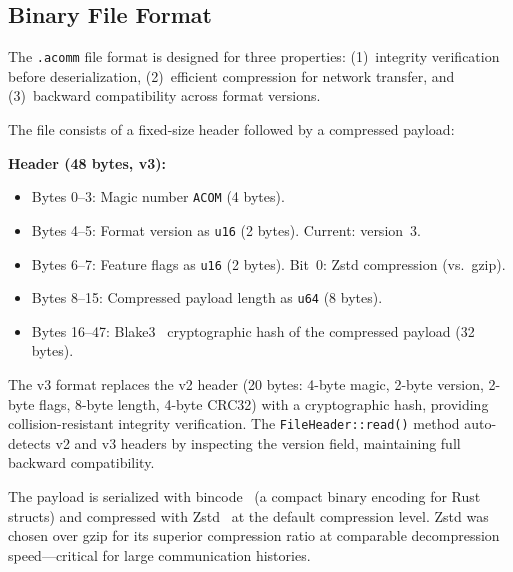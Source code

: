 \documentclass[10pt, twocolumn]{article}
\begin{document}
\subsection{Binary File Format}
\label{sec:format}

The \texttt{.acomm} file format is designed for three properties: (1)~integrity verification before deserialization, (2)~efficient compression for network transfer, and (3)~backward compatibility across format versions.

The file consists of a fixed-size header followed by a compressed payload:

\textbf{Header (48 bytes, v3):}
\begin{itemize}[nosep, leftmargin=*]
  \item Bytes 0--3: Magic number \texttt{ACOM} (4 bytes).
  \item Bytes 4--5: Format version as \texttt{u16} (2 bytes). Current: version~3.
  \item Bytes 6--7: Feature flags as \texttt{u16} (2 bytes). Bit~0: Zstd compression (vs.\ gzip).
  \item Bytes 8--15: Compressed payload length as \texttt{u64} (8 bytes).
  \item Bytes 16--47: Blake3~\cite{blake3_2020} cryptographic hash of the compressed payload (32 bytes).
\end{itemize}

The v3 format replaces the v2 header (20 bytes: 4-byte magic, 2-byte version, 2-byte flags, 8-byte length, 4-byte CRC32) with a cryptographic hash, providing collision-resistant integrity verification. The \texttt{FileHeader::read()} method auto-detects v2 and v3 headers by inspecting the version field, maintaining full backward compatibility.

The payload is serialized with bincode~\cite{bincode2023} (a compact binary encoding for Rust structs) and compressed with Zstd~\cite{zstd2016} at the default compression level. Zstd was chosen over gzip for its superior compression ratio at comparable decompression speed---critical for large communication histories.
\end{document}
